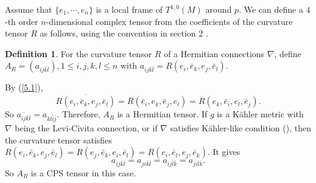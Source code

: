 \documentclass[10pt,reqno]{amsart}
\theoremstyle{definition}
\newtheorem{defn}[thm]{Definition}
\begin{document}
Assume that $\{e_1,\cdots, e_n\}$ is a local frame of $T^{1,0}(M)$ around $p$. We can define a $4$-th order $n$-dimensional complex tensor from the coefficients of the curvature tensor $R$ as follows, using the convention in section 2 .
\begin{defn}
For the curvature tensor $R$ of a Hermitian connections $\nabla$, define $A_R=(a_{ij\bar{k}\bar{l}}), 1\leq i,j,k,l\leq n$ with $a_{ij\bar{k}\bar{l}}=R(e_i,\bar{e}_k,e_j,\bar{e}_l)$. 
\end{defn}

By (\ref{5.1}), $$\overline{R(e_i,\bar{e}_k,e_j,\bar{e}_l)}=R(\bar{e}_i,e_k,\bar{e}_j,e_l)=R(e_k,\bar{e}_i,e_l,\bar{e}_j).$$ So $\overline{a_{ij\bar{k}\bar{l}}}=a_{kl\bar{i}\bar{j}}$. Therefore, $A_R$ is a Hermitian tensor. If $g$ is a K\"ahler metric with $\nabla$ being the Levi-Civita connection, or if $\nabla$ satisfies K\"ahler-like condition (\cite{YZ}), then the curvature tensor satisfies $R(e_i,\bar{e}_k,e_j,\bar{e}_l)=R(e_j,\bar{e}_k,e_i,\bar{e}_l)=R(e_i,\bar{e}_l,e_j,\bar{e}_k)$. It gives $$a_{ij\bar{k}\bar{l}}=a_{ji\bar{k}\bar{l}}=a_{ij\bar{l}\bar{k}}=a_{ji\bar{l}\bar{k}}.$$ So $A_R$ is a CPS tensor in this case.
\end{document}
